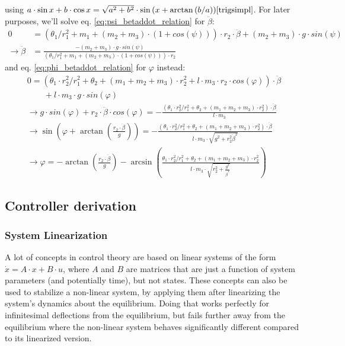 \documentclass{article}
\begin{document}
using $a \cdot \sin{x} + b \cdot \cos {x} = \sqrt{a^2+b^2} \cdot \sin{\left(x+\arctan{\left(b/a\right)} \right)} \cite{trigsimpl}$.
For later purposes, we'll solve eq. \ref{eq:psi_betaddot_relation} for $\ddot{\beta}$:
\begin{align}
0 &= (\theta_1/r_1^2  + m_1 + (m_2+m_3) \cdot (1+cos(\psi))) \cdot r_2 \cdot \ddot{\beta} + (m_2+m_3) \cdot g \cdot sin(\psi) \nonumber \\
\rightarrow \ddot{\beta} &= \frac{-(m_2+m_3) \cdot g \cdot sin(\psi) }{(\theta_1/r_1^2  + m_1 + (m_2+m_3) \cdot (1+cos(\psi))) \cdot r_2}
\label{eq:beta_ddot_vs_psi}
\end{align}
and eq. \ref{eq:phi_betaddot_relation} for $\varphi$ instead:
\begin{align}
0 = \left(\theta_1 \cdot r_2^2/r_1^2 + \theta_2 + (m_1 + m_2 + m_3) \cdot r_2^2 + l \cdot m_3 \cdot r_2 \cdot cos(\varphi) \right) \cdot \ddot{\beta}  \nonumber \\
\qquad  + l \cdot m_3 \cdot g \cdot sin(\varphi) \nonumber \\
\rightarrow  g \cdot sin(\varphi) + r_2 \cdot \ddot{\beta} \cdot cos(\varphi) = -\frac{\left(\theta_1 \cdot r_2^2/r_1^2 + \theta_2 + (m_1 + m_2 + m_3) \cdot r_2^2 \right) \cdot \ddot{\beta} }{l \cdot m_3} \nonumber \\
\rightarrow \sin{\left( \varphi + \arctan{\left( \frac{r_2 \cdot \ddot{\beta}}{g}\right)} \right)} = -\frac{\left(\theta_1 \cdot r_2^2/r_1^2 + \theta_2 + (m_1 + m_2 + m_3) \cdot r_2^2 \right) \cdot \ddot{\beta} }{l \cdot m_3 \cdot \sqrt{g^2 + r_2^2 \ddot{\beta}^2}} \nonumber \\
\rightarrow \varphi = -\arctan{\left( \frac{r_2 \cdot \ddot{\beta}}{g}\right)} - \arcsin{\left( \frac{\theta_1 \cdot r_2^2/r_1^2 + \theta_2 + (m_1 + m_2 + m_3) \cdot r_2^2 }{l \cdot m_3 \cdot \sqrt{r_2^2 + \frac{g^2}{\ddot{\beta}^2}}} \right)}
\label{eq:phi_vs_beta_ddot}
\end{align}

\subsection{Controller derivation}

\subsubsection{System Linearization}
\label{ss:syslin}
A lot of concepts in control theory are based on linear systems of the form $\dot{x} = A \cdot x + B \cdot u$, where $A$ and $B$ are matrices that are just a function of system parameters (and potentially time), but not states.
These concepts can also be used to stabilize a non-linear system, by applying them after linearizing the system's dynamics about the equilibrium.
Doing that works perfectly for infinitesimal deflections from the equilibrium, but fails further away from the equilibrium where the non-linear system behaves significantly different compared to its linearized version.
\end{document}
